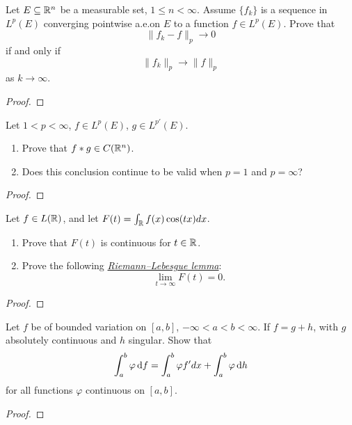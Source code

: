 \begin{problem}
Let $E\subseteq\mathbb{R}^n$ be a measurable set, $1\leq n<\infty$. Assume
$\{f_k\}$ is a sequence in $L^p(E)$ converging pointwise a.e.\@ on $E$ to a
function $f\in L^p(E)$. Prove that
\[
\|{f_k-f}\|_p\longrightarrow 0
\]
if and only if
\[
\|{f_k}\|_p\longrightarrow\|f\|_p
\]
as $k\to\infty$.
\end{problem}
\begin{proof}
\end{proof}

\begin{problem}
Let $1<p<\infty$, $f\in L^p(E)$, $g\in L^{p'}(E)$.
\begin{enumerate}[label=(\alph*),noitemsep]
\item Prove that $f*g\in C(\mathbb{R}^n)$.
\item Does this conclusion continue to be valid when $p=1$ and $p=\infty$?
\end{enumerate}
\end{problem}
\begin{proof}
\end{proof}

\begin{problem}
Let $f\in L(\mathbb{R})$, and let $F(t)=\int_{\mathbb{R}}f(x)\cos(tx)dx$.
\begin{enumerate}[label=(\alph*),noitemsep]
\item Prove that $F(t)$ is continuous for $t\in\mathbb{R}$.
\item Prove the following
  \href{https://en.wikipedia.org/wiki/Riemann–Lebesgue_lemma}{\emph{Riemann--Lebesgue
      lemma}}:
\[
\lim_{t\to\infty}F(t)=0.
\]
\end{enumerate}
\end{problem}
\begin{proof}
\end{proof}

\begin{problem}
Let $f$ be of bounded variation on $[a,b]$, $-\infty<a<b<\infty$. If
$f=g+h$, with $g$ absolutely continuous and $h$ singular. Show that
\[
\int_a^b\varphi \mathop{}\!\mathrm{d} f=\int_a^b\varphi f'dx+\int_a^b\varphi \mathop{}\!\mathrm{d} h
\]
for all functions $\varphi$ continuous on $[a,b]$.
\end{problem}
\begin{proof}
\end{proof}

